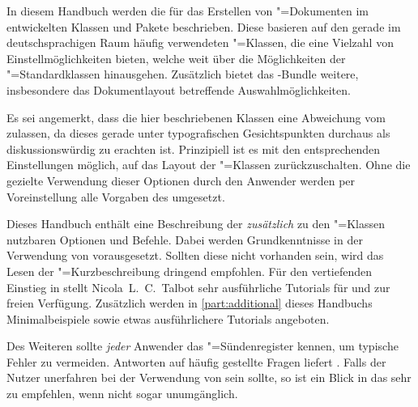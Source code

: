 \addchap[tocentry={}]{\prefacename}
In diesem Handbuch werden die für das Erstellen von "=Dokumenten 
im  entwickelten Klassen und Pakete 
beschrieben. Diese basieren auf den gerade im deutschsprachigen Raum häufig 
verwendeten \KOMAScript"=Klassen, die eine Vielzahl von Einstellmöglichkeiten 
bieten, welche weit über die Möglichkeiten der "=Standardklassen 
hinausgehen. Zusätzlich bietet das \TUDScript-Bundle weitere, insbesondere das 
Dokumentlayout betreffende Auswahlmöglichkeiten.

Es sei angemerkt, dass die hier beschriebenen Klassen eine Abweichung vom 
\TUDCD zulassen, da dieses gerade unter typografischen Gesichtspunkten 
durchaus als diskussionswürdig zu erachten ist. Prinzipiell ist es mit den 
entsprechenden Einstellungen möglich, auf das Layout der \KOMAScript"=Klassen 
zurückzuschalten. Ohne die gezielte Verwendung dieser Optionen durch den 
Anwender werden per Voreinstellung alle Vorgaben des \CDs umgesetzt.

Dieses Handbuch enthält eine Beschreibung der \emph{zusätzlich} zu den 
\KOMAScript"=Klassen nutzbaren Optionen und Befehle. Dabei werden 
Grundkenntnisse in der Verwendung von  vorausgesetzt. Sollten 
diese nicht vorhanden sein, wird das Lesen der "=Kurzbeschreibung
dringend empfohlen. Für den vertiefenden Einstieg in  stellt 
Nicola~L.~C.~Talbot sehr ausführliche Tutorials für 
und  zur 
freien Verfügung. Zusätzlich werden in \autoref{part:additional} dieses 
Handbuchs Minimalbeispiele sowie etwas ausführlichere Tutorials angeboten.

Des Weiteren sollte \emph{jeder} Anwender das "=Sündenregister 
kennen, um typische Fehler zu vermeiden. Antworten auf häufig gestellte Fragen 
liefert . Falls der 
Nutzer unerfahren bei der Verwendung von \KOMAScript{} sein sollte, so ist ein 
Blick in das  sehr zu empfehlen, wenn nicht 
sogar unumgänglich.

